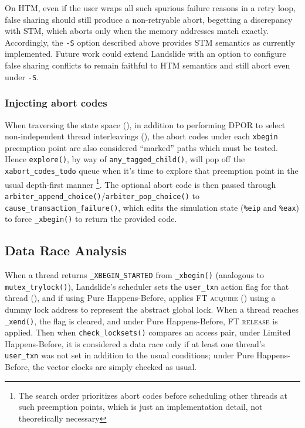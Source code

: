 On HTM, even if the user wraps all such spurious failure reasons in a retry loop,
false sharing should still produce a non-retryable abort,
begetting a discrepancy with STM,
which aborts only when the memory addresses match exactly.
Accordingly, the {\tt -S} option described above provides STM semantics as currently implemented.
Future work could extend Landslide with an option to configure false sharing conflicts
to remain faithful to HTM semantics and still abort even under {\tt -S}.

\subsubsection{Injecting abort codes}
When traversing the state space (\sect{\ref{sec:landslide-statespace}}),
in addition to performing DPOR to select non-independent thread interleavings (\sect{\ref{sec:landslide-dpor}}),
the abort codes under each {\tt xbegin} preemption point are also considered ``marked'' paths which must be tested.
Hence {\tt explore()}, by way of {\tt any\_tagged\_child()},
will pop off the {\tt xabort\_codes\_todo} queue
when it's time to explore that preemption point in the usual depth-first manner%
\footnote{The search order prioritizes abort codes before scheduling other threads
at such preemption points,
which is just an implementation detail, not theoretically necessary}.
The optional abort code is then passed through {\tt arbiter\_append\_choice()}/{\tt arbiter\_pop\_choice()}
to {\tt cause\_transaction\_failure()},
which edits the simulation state ({\tt \%eip} and {\tt \%eax})
to force {\tt \_xbegin()} to return the provided code.

\subsection{Data Race Analysis}
\label{sec:txn-datarace}

When a thread returns {\tt \_XBEGIN\_STARTED} from {\tt \_xbegin()}
(analogous to {\tt mutex\_trylock()}),
Landslide's scheduler sets the {\tt user\_txn} action flag for that thread (\sect{\ref{sec:landslide-scheduler}}),
and if using Pure Happens-Before,
applies \textsc{FT acquire} (\sect{\ref{sec:landslide-phb}}) using a dummy lock address to represent the abstract global lock.
When a thread reaches {\tt \_xend()},
the flag is cleared,
and under Pure Happens-Before,
\textsc{FT release} is applied.
Then when {\tt check\_locksets()} compares an access pair,
under Limited Happens-Before,
it is considered a data race only if at least one thread's {\tt user\_txn} was not set
in addition to the usual conditions; %
under Pure Happens-Before,
the vector clocks are simply checked as usual.

